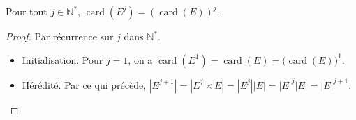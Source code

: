 %
\begin{theorem}
Pour tout \(𝑗∈ℕ^{\ast }\), \(\operatorname{card}(𝐸^𝑗)=(\operatorname{card}(𝐸))^𝑗\).
\end{theorem}
\begin{proof}
Par récurrence sur \(𝑗\) dans \(ℕ^{\ast}\).
\begin{itemize}
\item Initialisation. Pour \(𝑗=1\), on a
\(\operatorname{card}(𝐸^1)=\operatorname{card}(𝐸)=\bigl(\operatorname{card}(𝐸)\bigr)^1\).
\item Hérédité. Par ce qui précède, \(|𝐸^{𝑗+1}|=|𝐸^{𝑗}×𝐸|=|𝐸^{𝑗}||𝐸|=|𝐸|^{𝑗}|𝐸|=|𝐸|^{𝑗+1}\).
\end{itemize}
\end{proof}
